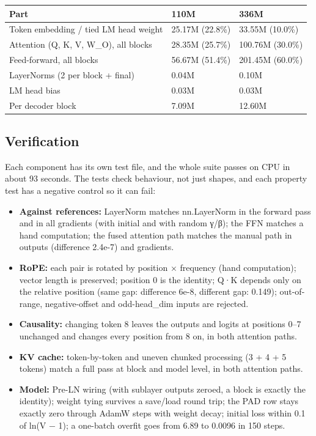 \documentclass[11pt]{article}
\begin{document}
\begin{center}
\small
\begin{tabular}{lll}
\toprule
\textbf{Part} & \textbf{110M} & \textbf{336M} \\
\midrule
Token embedding /\allowbreak{} tied LM head weight & 25.17M (22.8\%) & 33.55M (10.0\%) \\
Attention (Q, K, V, W\_\allowbreak{}O), all blocks & 28.35M (25.7\%) & 100.76M (30.0\%) \\
Feed-forward, all blocks & 56.67M (51.4\%) & 201.45M (60.0\%) \\
LayerNorms (2 per block + final) & 0.04M & 0.10M \\
LM head bias & 0.03M & 0.03M \\
Per decoder block & 7.09M & 12.60M \\
\bottomrule
\end{tabular}
\end{center}

\subsection{Verification}

Each component has its own test file, and the whole suite passes on CPU in about 93 seconds. The tests check behaviour, not just shapes, and each property test has a negative control so it can fail:

\begin{itemize}
\item \textbf{Against references:} LayerNorm matches nn.LayerNorm in the forward pass and in all gradients (with initial and with random γ/\allowbreak{}β); the FFN matches a hand computation; the fused attention path matches the manual path in outputs (difference 2.4e-7) and gradients.
\item \textbf{RoPE:} each pair is rotated by position × frequency (hand computation); vector length is preserved; position 0 is the identity; Q·K depends only on the relative position (same gap: difference 6e-8, different gap: 0.149); out-of-range, negative-offset and odd-head\_\allowbreak{}dim inputs are rejected.
\item \textbf{Causality:} changing token 8 leaves the outputs and logits at positions 0–7 unchanged and changes every position from 8 on, in both attention paths.
\item \textbf{KV cache:} token-by-token and uneven chunked processing (3 + 4 + 5 tokens) match a full pass at block and model level, in both attention paths.
\item \textbf{Model:} Pre-LN wiring (with sublayer outputs zeroed, a block is exactly the identity); weight tying survives a save/\allowbreak{}load round trip; the PAD row stays exactly zero through AdamW steps with weight decay; initial loss within 0.1 of ln(V − 1); a one-batch overfit goes from 6.89 to 0.0096 in 150 steps.
\end{itemize}
\end{document}
